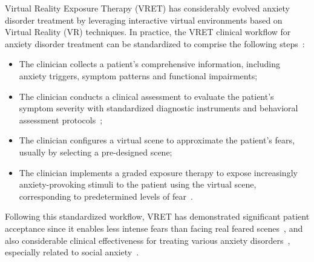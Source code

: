 \documentclass[]{interact}
\begin{document}
Virtual Reality Exposure Therapy (VRET) has considerably evolved anxiety disorder treatment by leveraging interactive virtual environments based on Virtual Reality (VR) techniques. %
In practice, the VRET clinical workflow for anxiety disorder treatment can be standardized to comprise the following steps~\cite{powers2008virtual, botella2017recent, boeldt2019using, emmelkamp2021virtual}: 
\begin{itemize}
    \item The clinician collects a patient's comprehensive information, including anxiety triggers, symptom patterns and functional impairments;
    \item The clinician conducts a clinical assessment to evaluate the patient's symptom severity with standardized diagnostic instruments and behavioral assessment protocols~\cite{boeldt2019using};
    \item The clinician configures a virtual scene to approximate the patient's fears, usually by selecting a pre-designed scene;
    \item The clinician implements a graded exposure therapy to expose increasingly anxiety-provoking stimuli to the patient using the virtual scene, corresponding to predetermined levels of fear~\cite{powers2008virtual}.
\end{itemize}
Following this standardized workflow, VRET has demonstrated significant patient acceptance since it enables less intense fears than facing real feared scenes~\cite{garcia2007comparing}, and also considerable clinical effectiveness for treating various anxiety disorders~\cite{parsons2008affective,botella2017recent, emmelkamp2021virtual}, especially related to social anxiety~\cite{powers2008virtual}.


\end{document}
